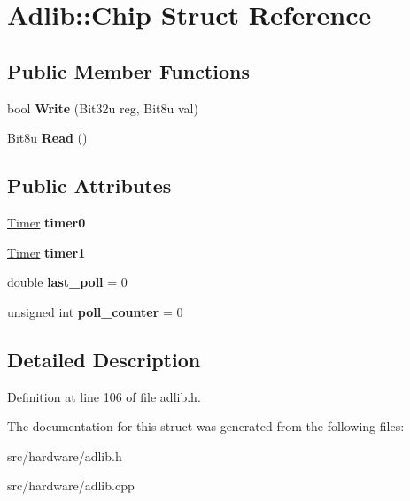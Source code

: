 \hypertarget{structAdlib_1_1Chip}{\section{Adlib\-:\-:Chip Struct Reference}
\label{structAdlib_1_1Chip}
}
\subsection*{Public Member Functions}
\begin{DoxyCompactItemize}
\item 
\hypertarget{structAdlib_1_1Chip_a126b7b335d1dc1e177947ffd87ae9340}{bool {\bfseries Write} (Bit32u reg, Bit8u val)}\label{structAdlib_1_1Chip_a126b7b335d1dc1e177947ffd87ae9340}

\item 
\hypertarget{structAdlib_1_1Chip_a472381a44ada102a7df220a9d16d002f}{Bit8u {\bfseries Read} ()}\label{structAdlib_1_1Chip_a472381a44ada102a7df220a9d16d002f}

\end{DoxyCompactItemize}
\subsection*{Public Attributes}
\begin{DoxyCompactItemize}
\item 
\hypertarget{structAdlib_1_1Chip_aba73d2324852739af276c44f25b2dfc4}{\hyperlink{classAdlib_1_1Timer}{Timer} {\bfseries timer0}}\label{structAdlib_1_1Chip_aba73d2324852739af276c44f25b2dfc4}

\item 
\hypertarget{structAdlib_1_1Chip_a228123e2ffbf3174ab9f0b7782e28fae}{\hyperlink{classAdlib_1_1Timer}{Timer} {\bfseries timer1}}\label{structAdlib_1_1Chip_a228123e2ffbf3174ab9f0b7782e28fae}

\item 
\hypertarget{structAdlib_1_1Chip_ac92c16633c6051b3b9721944a809925c}{double {\bfseries last\-\_\-poll} = 0}\label{structAdlib_1_1Chip_ac92c16633c6051b3b9721944a809925c}

\item 
\hypertarget{structAdlib_1_1Chip_a0f964ac7fe648a9302e5c0ba219fb7da}{unsigned int {\bfseries poll\-\_\-counter} = 0}\label{structAdlib_1_1Chip_a0f964ac7fe648a9302e5c0ba219fb7da}

\end{DoxyCompactItemize}


\subsection{Detailed Description}


Definition at line 106 of file adlib.\-h.



The documentation for this struct was generated from the following files\-:\begin{DoxyCompactItemize}
\item 
src/hardware/adlib.\-h\item 
src/hardware/adlib.\-cpp\end{DoxyCompactItemize}
